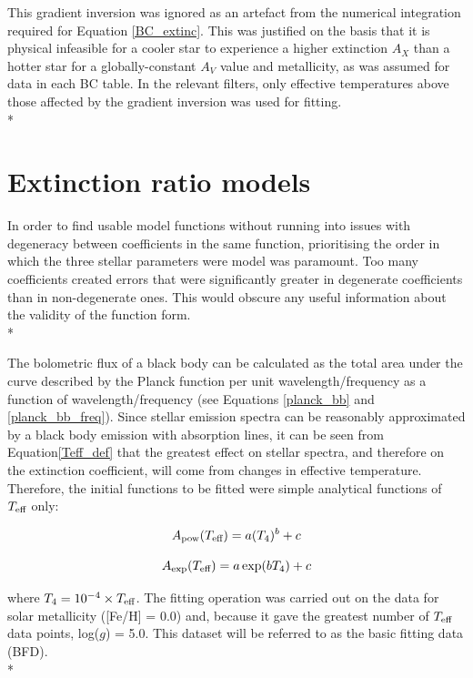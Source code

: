 \documentclass[12pt, a4paper]{report}
\begin{document}
This gradient inversion was ignored as an artefact from the numerical integration required for Equation \ref{BC_extinc}. This was justified on the basis that it is physical infeasible for a cooler star to experience a higher extinction $A_{X}$ than a hotter star for a globally-constant $A_{V}$ value and metallicity, as was assumed for data in each BC table. In the relevant filters, only effective temperatures above those affected by the gradient inversion was used for fitting.\\*

\section{Extinction ratio models} \label{ext_models}

In order to find usable model functions without running into issues with degeneracy between coefficients in the same function, prioritising the order in which the three stellar parameters were model was paramount. Too many coefficients created errors that were significantly greater in degenerate coefficients than in non-degenerate ones. This would obscure any useful information about the validity of the function form.\\*

The bolometric flux of a black body can be calculated as the total area under the curve described by the Planck function per unit wavelength/frequency as a function of wavelength/frequency  (see Equations \ref{planck_bb} and \ref{planck_bb_freq}). Since stellar emission spectra can be reasonably approximated by a black body emission with absorption lines, it can be seen from Equation\ref{Teff_def} that the greatest effect on stellar spectra, and therefore on the extinction coefficient, will come from changes in effective temperature. Therefore, the initial functions to be fitted were simple analytical functions of $T_{\textnormal{eff}}$ only:

\begin{equation}
A_{\textnormal{pow}} (T_{\textnormal{eff}}) = a (T_{4})^{b} + c
\label{Teff_pow}
\end{equation}

\begin{equation}
A_{\textnormal{exp}} (T_{\textnormal{eff}}) = a \exp(b T_{4}) + c
\label{Teff_exp}
\end{equation}

where $T_{4} = 10^{-4} \times T_{\textnormal{eff}}$. The fitting operation was carried out on the data for solar metallicity ([Fe/H] = 0.0) and, because it gave the greatest number of $T_{\textnormal{eff}}$ data points, log($g$) = 5.0. This dataset will be referred to as the basic fitting data (BFD).\\*
\end{document}
